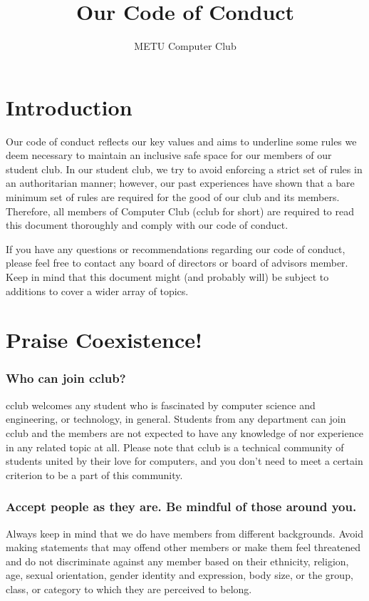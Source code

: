 \documentclass{article}
\title{Our Code of Conduct}
\author{METU Computer Club}
\begin{document}
\maketitle
\section*{Introduction}

Our code of conduct reflects our key values and aims to underline some rules we
deem necessary to maintain an inclusive safe space for our members of our
student club. In our student club, we try to avoid enforcing a strict set of
rules in an authoritarian manner; however, our past experiences have shown that
a bare minimum set of rules are required for the good of our club and its
members. Therefore, all members of Computer Club (cclub for short) are required
to read this document thoroughly and comply with our code of conduct.


If you have any questions or recommendations regarding our code of conduct,
please feel free to contact any board of directors or board of advisors member.
Keep in mind that this document might (and probably will) be subject to
additions to cover a wider array of topics.

\section*{Praise Coexistence!}

\subsubsection*{Who can join cclub?}
cclub welcomes any student who is fascinated by computer science and
engineering, or technology, in general. Students from any department can join
cclub and the members are not expected to have any knowledge of nor experience
in any related topic at all. Please note that cclub is a technical community of
students united by their love for computers, and you don't need to meet a
certain criterion to be a part of this community.

\subsubsection*{Accept people as they are. Be mindful of those around you.}
Always keep in mind that we do have members from different backgrounds.  Avoid
making statements that may offend other members or make them feel threatened
and do not discriminate against any member based on their ethnicity, religion,
age, sexual orientation, gender identity and expression, body size, or the
group, class, or category to which they are perceived to belong.
\end{document}
